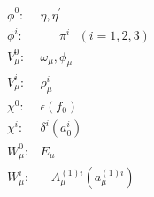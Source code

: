 \begin{equation}
\begin{array}{cc}
\phi^{0}: & \eta, \eta^{'}   \\
\phi^{i}: & ~~~~~~~\pi^{i}~~~(i=1, 2, 3)   \\
V_{\mu}^{0}: & \omega_{\mu}, \phi_{\mu}  \\
V_{\mu}^{i}: & \rho_{\mu}^{i}  \\
\chi^{0}: & \epsilon (f_{0})  \\
\chi^{i}: &  \delta^{i} (a_{0}^{i})   \\
W_{\mu}^{0}: & E_{\mu} \\
W_{\mu}^{i}: & ~~~~A_{\mu}^{(1) i} (a_{\mu}^{(1) i})
\end{array}
\end{equation}

